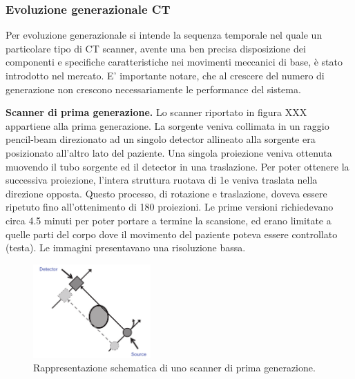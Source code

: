 \documentclass[a4paper,11pt, oneside]{article}
\begin{document}
                \subsubsection{Evoluzione generazionale CT}
                    \par
                        Per evoluzione generazionale si intende la sequenza temporale nel quale un particolare tipo di CT scanner, avente una ben precisa disposizione dei componenti e specifiche caratteristiche nei movimenti meccanici di base, è stato introdotto nel mercato. E’ importante notare, che al crescere del numero di generazione non crescono necessariamente le performance del sistema.
                    
                    \bigskip
                    \par
                        \textbf{Scanner di prima generazione.} Lo scanner riportato in figura XXX appartiene alla prima generazione. La sorgente veniva collimata in un raggio pencil-beam direzionato ad un singolo detector allineato alla sorgente era posizionato all’altro lato del paziente. Una singola proiezione veniva ottenuta muovendo il tubo sorgente ed il detector in una traslazione. Per poter ottenere la successiva proiezione, l’intera struttura ruotava di 1\degree e veniva traslata nella direzione opposta. Questo processo, di rotazione e traslazione, doveva essere ripetuto fino all’ottenimento di 180 proiezioni. Le prime versioni richiedevano circa 4.5 minuti per poter portare a termine la scansione, ed erano limitate a quelle parti del corpo dove il movimento del paziente poteva essere controllato (testa). Le immagini presentavano una risoluzione bassa.
                        
                        \begin{figure}[h]
                            \centering
                            \includegraphics[width=0.4\textwidth]{first-generation}
                            \caption{Rappresentazione schematica di uno scanner di prima generazione.}
                            \label{fig:third-generation}
                        \end{figure}
                        
\end{document}
